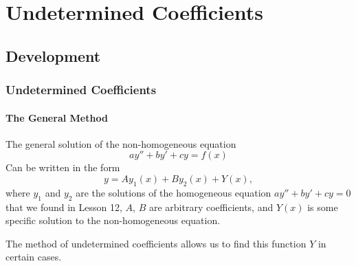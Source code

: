 \documentclass[9pt,xcolor=x11names,compress]{beamer}
\begin{document}
\section{Undetermined Coefficients}
\subsection{Development}

\begin{frame}\frametitle{Undetermined Coefficients}
\framesubtitle{The General Method}
\begin{theorem}
	The general solution of the non-homogeneous equation
	\begin{equation*}
		ay''+by'+cy=f(x)
	\end{equation*}
	Can be written in the form 
	\begin{equation*}
		y=Ay_1(x)+By_2(x)+Y(x),
	\end{equation*}
	where $y_1$ and $y_2$ are the solutions of the homogeneous equation $ay''+by'+cy=0$ that we found in Lesson 12, $A$, $B$ are arbitrary coefficients, and $Y(x)$ is some specific solution to the non-homogeneous equation.
\end{theorem}
\pause The method of undetermined coefficients allows us to find this function $Y$ in certain cases.
\end{frame}
\end{document}
